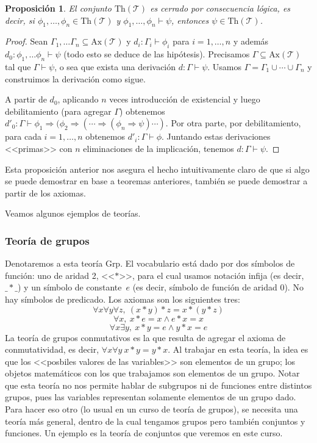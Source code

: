 \documentclass[a4paper, 12pt]{report}
\newcommand{\Ra}{\Rightarrow}
\newcommand{\te}{\text}
\newtheorem{prop}[teorema]{Proposición}
\theoremstyle{definition}
\begin{document}
\begin{prop}
	El conjunto $\te{Th}(\mathcal{T})$ es cerrado por consecuencia lógica, es decir, si $\phi_1,\dots,\phi_n\in\te{Th}(\mathcal{T})$ y $\phi_1,\dots,\phi_n\vdash\psi$, entonces $\psi\in\te{Th}(\mathcal{T})$.
\end{prop}
\begin{proof}
	Sean $\Gamma_1,\dots\Gamma_n\subseteq\te{Ax}(\mathcal{T})$ y  $d_i:\Gamma_i\vdash\phi_i$ para $i=1,\dots,n$ y además $d_0:\phi_1,\dots\phi_n\vdash\psi$ (todo esto se deduce de las hipótesis). Precisamos $\Gamma\subseteq\te{Ax}(\mathcal{T})$ tal que $\Gamma\vdash\psi$, o sea que exista una derivación $d:\Gamma\vdash\psi$. Usamos $\Gamma = \Gamma_1\cup\cdots\cup\Gamma_n$ y construimos la derivación como sigue.
	
	A partir de $d_0$, aplicando $n$ veces introducción de existencial y luego debilitamiento (para agregar $\Gamma$) obtenemos $d'_0:\Gamma\vdash\phi_1\Ra(\phi_2\Ra(\cdots\Ra(\phi_n\Ra\psi)\cdots)$. Por otra parte, por debilitamiento, para cada $i=1,\dots,n$ obtenemos $d'_i:\Gamma\vdash\phi$. Juntando estas derivaciones <<primas>> con $n$ eliminaciones de la implicación, tenemos $d:\Gamma\vdash\psi$.
\end{proof}
Esta proposición anterior nos asegura el hecho intuitivamente claro de que si algo se puede demostrar en base a teoremas anteriores, también se puede demostrar a partir de los axiomas.

Veamos algunos ejemplos de teorías.

\subsubsection{Teoría de grupos}

Denotaremos a esta teoría Grp. El vocabulario está dado por dos símbolos de función: uno de aridad 2, <<$*$>>, para el cual usamos notación infija (es decir, $\_*\_$) y un símbolo de constante~$e$ (es decir, símbolo de función de aridad 0). No hay símbolos de predicado. Los axiomas son los siguientes tres:
\newpage
$$\forall x\forall y\forall z,~(x*y)*z=x*(y*z)
$$
$$\forall x,~x*e=x\wedge e*x=x
$$
$$\forall x\exists y,~x*y=e\wedge y*x=e
$$
La teoría de grupos conmutativos es la que resulta de agregar el axioma de conmutatividad, es decir, $\forall x\forall y~x*y=y*x$. Al trabajar en esta teoría, la idea es que los <<posbiles valores de las variables>> son elementos de un grupo; los objetos matemáticos con los que trabajamos son elementos de un grupo. Notar que esta teoría no nos permite hablar de subgrupos ni de funciones entre distintos grupos, pues las variables representan solamente elementos de un grupo dado. Para hacer eso otro (lo usual en un curso de teoría de grupos), se necesita una teoría más general, dentro de la cual tengamos grupos pero también conjuntos y funciones. Un ejemplo es la teoría de conjuntos que veremos en este curso.
\end{document}
